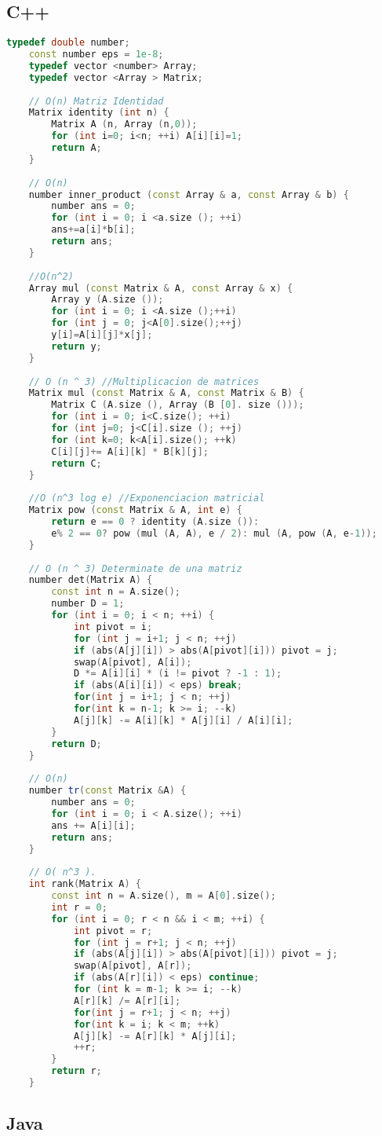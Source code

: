 \subsection{C++}

\begin{lstlisting}[language=C++]
	typedef double number;
	const number eps = 1e-8;
	typedef vector <number> Array;
	typedef vector <Array > Matrix;
	
	// O(n) Matriz Identidad
	Matrix identity (int n) {
		Matrix A (n, Array (n,0));
		for (int i=0; i<n; ++i) A[i][i]=1;
		return A;
	}
	
	// O(n)
	number inner_product (const Array & a, const Array & b) {
		number ans = 0;
		for (int i = 0; i <a.size (); ++i)
		ans+=a[i]*b[i];
		return ans;
	}
	
	//O(n^2)
	Array mul (const Matrix & A, const Array & x) {
		Array y (A.size ());
		for (int i = 0; i <A.size ();++i)
		for (int j = 0; j<A[0].size();++j)
		y[i]=A[i][j]*x[j];
		return y;
	}
	
	// O (n ^ 3) //Multiplicacion de matrices
	Matrix mul (const Matrix & A, const Matrix & B) {
		Matrix C (A.size (), Array (B [0]. size ()));
		for (int i = 0; i<C.size(); ++i)
		for (int j=0; j<C[i].size (); ++j)
		for (int k=0; k<A[i].size(); ++k)
		C[i][j]+= A[i][k] * B[k][j];
		return C;
	}
	
	//O (n^3 log e) //Exponenciacion matricial
	Matrix pow (const Matrix & A, int e) {
		return e == 0 ? identity (A.size ()):
		e% 2 == 0? pow (mul (A, A), e / 2): mul (A, pow (A, e-1));
	}
	
	// O (n ^ 3) Determinate de una matriz
	number det(Matrix A) {
		const int n = A.size();
		number D = 1;
		for (int i = 0; i < n; ++i) {
			int pivot = i;
			for (int j = i+1; j < n; ++j)
			if (abs(A[j][i]) > abs(A[pivot][i])) pivot = j;
			swap(A[pivot], A[i]);
			D *= A[i][i] * (i != pivot ? -1 : 1);
			if (abs(A[i][i]) < eps) break;
			for(int j = i+1; j < n; ++j)
			for(int k = n-1; k >= i; --k)
			A[j][k] -= A[i][k] * A[j][i] / A[i][i];
		}
		return D;
	}
	
	// O(n)
	number tr(const Matrix &A) {
		number ans = 0;
		for (int i = 0; i < A.size(); ++i)
		ans += A[i][i];
		return ans;
	}
	
	// O( n^3 ).
	int rank(Matrix A) {
		const int n = A.size(), m = A[0].size();
		int r = 0;
		for (int i = 0; r < n && i < m; ++i) {
			int pivot = r;
			for (int j = r+1; j < n; ++j)
			if (abs(A[j][i]) > abs(A[pivot][i])) pivot = j;
			swap(A[pivot], A[r]);
			if (abs(A[r][i]) < eps) continue;
			for (int k = m-1; k >= i; --k)
			A[r][k] /= A[r][i];
			for(int j = r+1; j < n; ++j)
			for(int k = i; k < m; ++k)
			A[j][k] -= A[r][k] * A[j][i];
			++r;
		}
		return r;
	}
\end{lstlisting}

\subsection{Java}
